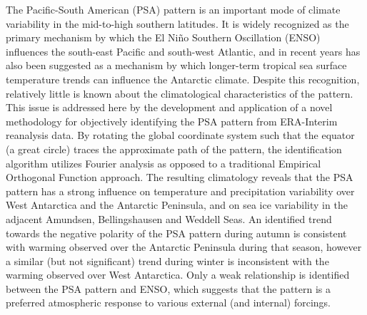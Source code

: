 The Pacific-South American (PSA) pattern is an important mode of climate variability in the mid-to-high southern latitudes. It is widely recognized as the primary mechanism by which the El Ni\~{n}o Southern Oscillation (ENSO) influences the south-east Pacific and south-west Atlantic, and in recent years has also been suggested as a mechanism by which longer-term tropical sea surface temperature trends can influence the Antarctic climate. Despite this recognition, relatively little is known about the climatological characteristics of the pattern. This issue is addressed here by the development and application of a novel methodology for objectively identifying the PSA pattern from ERA-Interim reanalysis data. By rotating the global coordinate system such that the equator (a great circle) traces the approximate path of the pattern, the identification algorithm utilizes Fourier analysis as opposed to a traditional Empirical Orthogonal Function approach. The resulting climatology reveals that the PSA pattern has a strong influence on temperature and precipitation variability over West Antarctica and the Antarctic Peninsula, and on sea ice variability in the adjacent Amundsen, Bellingshausen and Weddell Seas. An identified trend towards the negative polarity of the PSA pattern during autumn is consistent with warming observed over the Antarctic Peninsula during that season, however a similar (but not significant) trend during winter is inconsistent with the warming observed over West Antarctica. Only a weak relationship is identified between the PSA pattern and ENSO, which suggests that the pattern is a preferred atmospheric response to various external (and internal) forcings.